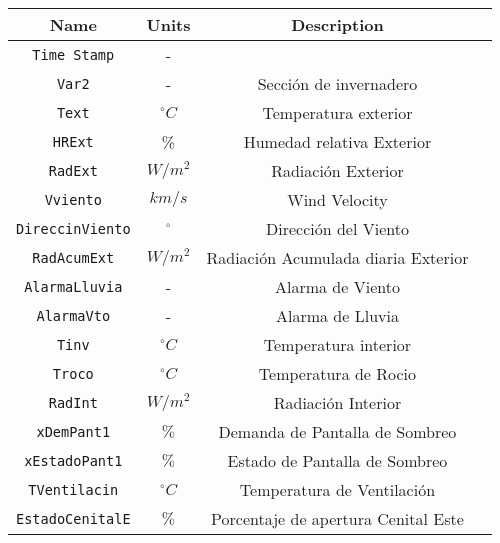 
\begin{table}
    \centering
    \begin{tabular}{|c|c|c|c|}
        \hline
        \textbf{Name}           & \textbf{Units} & \textbf{Description}         \\ 
        \hline
        \texttt{Time Stamp}         & -              &                              \\ \hline
        \texttt{Var2}               & -              & Sección de invernadero       \\ \hline
        \texttt{Text}               & $^\circ C$     & Temperatura exterior         \\ \hline
        \texttt{HRExt}              & \%             & Humedad relativa Exterior    \\ \hline
        \texttt{RadExt}             & $W/m^2$        & Radiación Exterior           \\ \hline
        \texttt{Vviento}            & $km/s$         & Wind Velocity                \\  \hline
        \texttt{DireccinViento}     & $^\circ$       & Dirección del Viento         \\ \hline
        \texttt{RadAcumExt}         & $W/m^2$        & Radiación Acumulada diaria Exterior \\ \hline
        \texttt{AlarmaLluvia}       & -              & Alarma de Viento             \\ \hline
        \texttt{AlarmaVto}          & -              & Alarma de Lluvia             \\ \hline
        \texttt{Tinv}               & $^\circ C$     & Temperatura interior         \\ \hline
        \texttt{Troco}              & $^\circ C$     & Temperatura de Rocio         \\  \hline
        \texttt{RadInt}             & $W/m^2$        & Radiación Interior               \\ \hline
        \texttt{xDemPant1}          & $\%$           & Demanda de Pantalla de Sombreo   \\ \hline
        \texttt{xEstadoPant1}       & $\%$           & Estado de Pantalla de Sombreo    \\ \hline
        \texttt{TVentilacin}        & $^\circ C$     & Temperatura de Ventilación       \\ \hline
        \texttt{EstadoCenitalE}     & $\%$           & Porcentaje de apertura Cenital Este      \\ \hline

\end{tabular}
\end{table}
